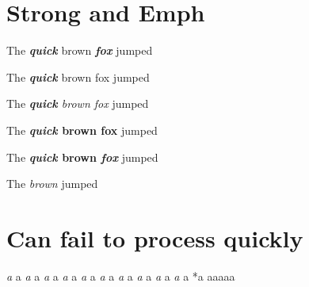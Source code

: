 
\def\mytitle{Edge Cases}


\part{Strong and Emph}
\label{strongandemph}

The \textbf{\emph{quick}} brown \textbf{\emph{fox}} jumped

The \textbf{\emph{quick}} brown fox jumped

The \emph{\textbf{quick} brown fox} jumped

The \textbf{\emph{quick} brown fox} jumped

The \textbf{\emph{quick} brown \emph{fox}} jumped

The \emph{ brown } jumped

\part{Can fail to process quickly}
\label{canfailtoprocessquickly}

\emph{a
}a
\emph{a
}a
\emph{a
}a
\emph{a
}a
\emph{a
}a
\emph{a
}a
\emph{a
}a
\emph{a
}a
\emph{a
}a
\emph{a
}a
*a
aaaaa




